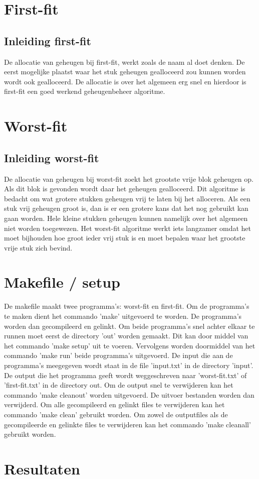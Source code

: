 \documentclass[11pt]{article}
\begin{document}
	\section{First-fit}\label{sec:first-fit}
	\subsection{Inleiding first-fit}\label{sec:inleidingff}
	De allocatie van geheugen bij first-fit, werkt zoals de naam al doet denken. De eerst mogelijke plaatst waar het stuk geheugen gealloceerd zou kunnen worden wordt ook gealloceerd. De allocatie is over het algemeen erg snel en hierdoor is first-fit een goed werkend geheugenbeheer algoritme.


	\section{Worst-fit}\label{sec:worst-fit}
	\subsection{Inleiding worst-fit}\label{sec:inleidingwf}
	De allocatie van geheugen bij worst-fit zoekt het grootste vrije blok geheugen op. Als dit blok is gevonden wordt daar het geheugen gealloceerd. Dit algoritme is bedacht om wat grotere stukken geheugen vrij te laten bij het alloceren. Als een stuk vrij geheugen groot is, dan is er een grotere kans dat het nog gebruikt kan gaan worden. Hele kleine stukken geheugen kunnen namelijk over het algemeen niet worden toegewezen. Het worst-fit algoritme werkt iets langzamer omdat het moet bijhouden hoe groot ieder vrij stuk is en moet bepalen waar het grootste vrije stuk zich bevind.


	\section{Makefile / setup}\label{sec:makefile}
	De makefile maakt twee programma's: worst-fit en first-fit. Om de programma's te maken dient het commando 'make' uitgevoerd te worden. De programma's worden dan gecompileerd en gelinkt. Om beide programma's snel achter elkaar te runnen moet eerst de directory 'out' worden gemaakt. Dit kan door middel van het commando 'make setup' uit te voeren. Vervolgens worden doormiddel van het commando 'make run' beide programma's uitgevoerd. De input die aan de programma's meegegeven wordt staat in de file 'input.txt' in de directory 'input'. De output die het programma geeft wordt weggeschreven naar 'worst-fit.txt' of 'first-fit.txt' in de directory out. Om de output snel te verwijderen kan het commando 'make cleanout' worden uitgevoerd. De uitvoer bestanden worden dan verwijderd. Om alle gecompileerd en gelinkt files te verwijderen kan het commando 'make clean' gebruikt worden. Om zowel de outputfiles als de gecompileerde en gelinkte files te verwijderen kan het commando 'make cleanall' gebruikt worden.

	\section{Resultaten}\label{sec:resultaten}
\end{document}
